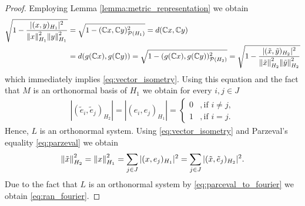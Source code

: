 \begin{proof}
	Employing Lemma \ref{lemma:metric_representation} we obtain
	\begin{align*}
		\sqrt{1 - \dfrac{|(x,y)_{H_1}|^2}{\norm[H_1]{x}^2 \norm[H_1]{y}^2}} &= \sqrt{1 - (\C x,\C y)_{\mathcal{P}(H_1)}^2} = d(\C x,\C y) \\
		&= d\pbraces{g(\C x), g(\C y)} = \sqrt{1 - (g(\C x), g(\C y))_{\mathcal{P}(H_2)}^2} = \sqrt{1 - \dfrac{|(\tilde{x}, \tilde{y})_{H_2}|^2}{\norm[H_2]{\tilde{x}}^2 \norm[H_2]{\tilde{y}}^2}}
	\end{align*}
	which immediately implies \eqref{eq:vector_isometry}. Using this equation and the fact that $M$ is an orthonormal basis of $H_1$ we obtain for every $i,j \in J$ 
	\begin{align*}
	|(\tilde{e}_i, \tilde{e}_j)_{H_2}| = |(e_i, e_j)_{H_1}| = 
	\begin{cases}
	0 &, \text{if } i \neq j, \\
	1 &, \text{if } i = j.
	\end{cases}
	\end{align*}
	Hence, $L$ is an orthonormal system. Using \eqref{eq:vector_isometry} and Parzeval's equality \eqref{eq:parzeval} we obtain
	\begin{align*}
	\norm[H_2]{\tilde{x}}^2 = \norm[H_1]{x}^2 = \sum_{j \in J} |(x, e_j)_{H_1}|^2 = \sum_{j \in J} |(\tilde{x}, \tilde{e}_j)_{H_2}|^2.
	\end{align*}
	Due to the fact that $L$ is an orthonormal system by \eqref{eq:parceval_to_fourier} we obtain \eqref{eq:ran_fourier}.
\end{proof}